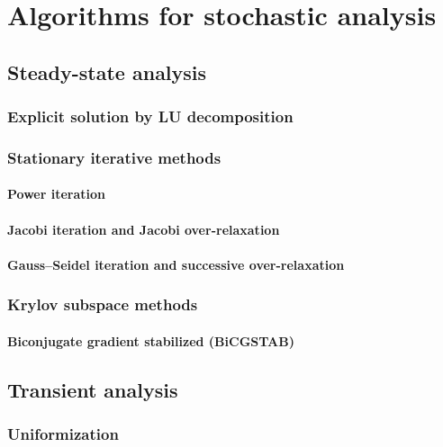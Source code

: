 \chapter{Algorithms for stochastic analysis}
\label{chap:algorithm}

\section{Steady-state analysis}

\subsection{Explicit solution by LU decomposition}

\subsection{Stationary iterative methods}

\subsubsection{Power iteration}

\subsubsection{Jacobi iteration and Jacobi over-relaxation}

\subsubsection{Gauss--Seidel iteration and successive over-relaxation}

\subsection{Krylov subspace methods}

\subsubsection{Biconjugate gradient stabilized (BiCGSTAB)}

\section{Transient analysis}

\subsection{Uniformization}

